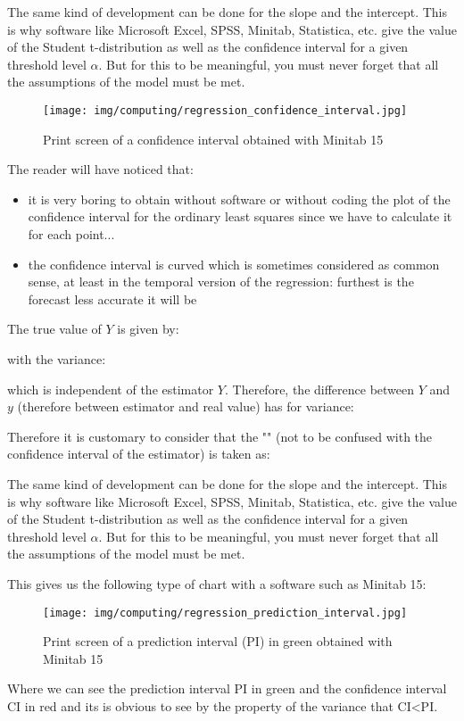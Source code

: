 	\begin{tcolorbox}[title=Remark,colframe=black,arc=10pt]
	The same kind of development can be done for the slope and the intercept. This is why software like Microsoft Excel, SPSS, Minitab, Statistica, etc. give the value of the Student t-distribution as well as the confidence interval for a given threshold level $\alpha$. But for this to be meaningful, you must never forget that all the assumptions of the model must be met.
	\end{tcolorbox}
	\begin{figure}[H]
		\centering
		\texttt{[image: img/computing/regression\_confidence\_interval.jpg]}
		\caption{Print screen of a confidence interval obtained with Minitab 15}
	\end{figure}
	The reader will have noticed that:
	\begin{itemize}
		\item it is very boring to obtain without software or without coding the plot of the confidence interval for the ordinary least squares since we have to calculate it for each point...
		
		\item the confidence interval is curved which is sometimes considered as common sense, at least in the temporal version of the regression: furthest is the forecast less accurate it will be
	\end{itemize}
	
	The true value of $Y$ is given by:
	
	with the variance:
	
	which is independent of the estimator $Y$. Therefore, the difference between $Y$ and $y$ (therefore between estimator and real value) has for variance:
	
	Therefore it is customary to consider that the  "" (not to be confused with the confidence interval of the estimator) is taken as:
	
	\begin{tcolorbox}[title=Remark,colframe=black,arc=10pt]
	The same kind of development can be done for the slope and the intercept. This is why software like Microsoft Excel, SPSS, Minitab, Statistica, etc. give the value of the Student t-distribution as well as the confidence interval for a given threshold level $\alpha$. But for this to be meaningful, you must never forget that all the assumptions of the model must be met.
	\end{tcolorbox}
	This gives us the following type of chart with a software such as Minitab 15:
	\begin{figure}[H]
		\centering
		\texttt{[image: img/computing/regression\_prediction\_interval.jpg]}
		\caption{Print screen of a prediction interval (PI) in green obtained with Minitab 15}
	\end{figure}
	Where we can see the prediction interval PI in green and the confidence interval CI in red and its is obvious to see by the property of the variance that CI<PI.
	

